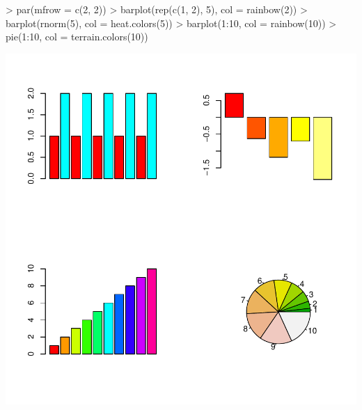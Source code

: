 \documentclass{scrartcl}
\begin{document}
\begin{Schunk}
\begin{Sinput}
> par(mfrow = c(2, 2))
> barplot(rep(c(1, 2), 5), col = rainbow(2))
> barplot(rnorm(5), col = heat.colors(5))
> barplot(1:10, col = rainbow(10))
> pie(1:10, col = terrain.colors(10))
\end{Sinput}
\end{Schunk}
\includegraphics{figures/f-042}



\printindex

\end{document}
